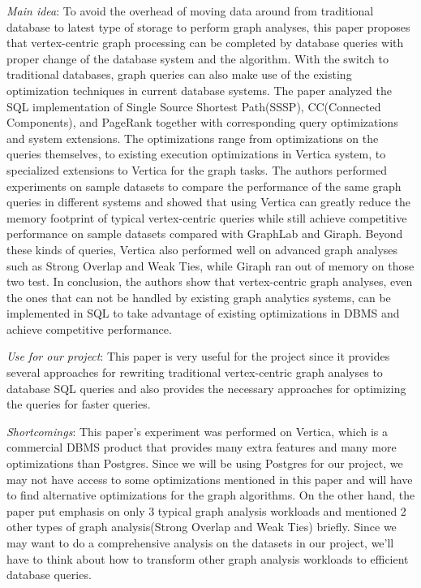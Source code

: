 \begin{itemize*}
\item {\em Main idea}: To avoid the overhead of moving data around from traditional database to latest type of storage to perform graph analyses, this paper proposes that vertex-centric graph processing can be completed by database queries with proper change of the database system and the algorithm. With the switch to traditional databases, graph queries can also make use of the existing optimization techniques in current database systems. The paper analyzed the SQL implementation of Single Source Shortest Path(SSSP), CC(Connected Components), and PageRank together with corresponding query optimizations and system extensions. The optimizations range from optimizations on the queries themselves, to existing execution optimizations in Vertica system, to specialized extensions to Vertica for the graph tasks. The authors performed experiments on sample datasets to compare the performance of the same graph queries in different systems and showed that using Vertica can greatly reduce the memory footprint of typical vertex-centric queries while still achieve competitive performance on sample datasets compared with GraphLab and Giraph. Beyond these kinds of queries, Vertica also performed well on advanced graph analyses such as Strong Overlap and Weak Ties, while Giraph ran out of memory on those two test. In conclusion, the authors show that vertex-centric graph analyses, even the ones that can not be handled by existing graph analytics systems, can be implemented in SQL to take advantage of existing optimizations in DBMS and achieve competitive performance.
\item {\em Use for our project}:
      This paper is very useful for the project since it provides several approaches for rewriting traditional vertex-centric graph analyses to database SQL queries and also provides the necessary approaches for optimizing the queries for faster queries. 
\item {\em Shortcomings}:
      This paper’s experiment was performed on Vertica, which is a commercial DBMS product that provides many extra features and many more optimizations than Postgres. Since we will be using Postgres for our project, we may not have access to some optimizations mentioned in this paper and will have to find alternative optimizations for the graph algorithms. On the other hand, the paper put emphasis on only 3 typical graph analysis workloads and mentioned 2 other types of graph analysis(Strong Overlap and Weak Ties) briefly. Since we may want to do a comprehensive analysis on the datasets in our project, we’ll have to think about how to transform other graph analysis workloads to efficient database queries.
\end{itemize*}

